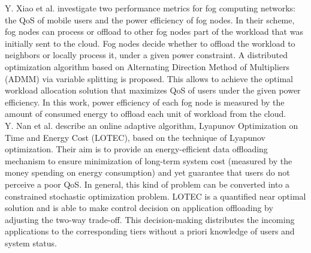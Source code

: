 \noindent\tab Y. Xiao et al. \cite{xiao2017qoe} investigate two performance metrics for fog computing networks: the QoS of mobile users and the power efficiency of fog nodes. In their scheme, fog nodes can process or offload to other fog nodes part of the workload that was initially sent to the cloud. Fog nodes decide whether to offload the workload to neighbors or locally process it, under a given power constraint. A distributed optimization algorithm based on Alternating Direction Method of Multipliers (ADMM) via variable splitting is proposed. This allows to achieve the optimal workload allocation solution that maximizes QoS of users under the given power efficiency. In this work, power efficiency of each fog node is measured by the amount of consumed energy to offload each unit of workload from the cloud.\\
\noindent\tab Y. Nan et al. \cite{nan2017adaptive} describe an online adaptive algorithm, Lyapunov Optimization on Time and Energy Cost (LOTEC), based on the technique of Lyapunov optimization. Their aim is to provide an energy-efficient data offloading mechanism to ensure minimization of long-term system cost (measured by the money spending on energy consumption) and yet guarantee that users do not perceive a poor QoS. In general, this kind of problem can be converted into a constrained stochastic optimization problem. LOTEC is a quantified near optimal solution and is able to make control decision on application offloading by adjusting the two-way trade-off. This decision-making distributes the incoming applications to the corresponding tiers without a priori knowledge of users and system status.

